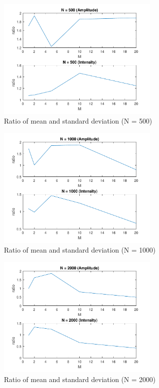 \documentclass{article}
\begin{document}
\begin{figure}[H]
	\centering
	\includegraphics[width = 0.7\textwidth]{src/2pi/ratio_500.pdf}
	\caption{Ratio of mean and standard deviation (N = 500)}
	\label{fig:ratio-500}
\end{figure}
\begin{figure}[H]
	\centering
	\includegraphics[width = 0.7\textwidth]{src/2pi/ratio_1000.pdf}
	\caption{Ratio of mean and standard deviation (N = 1000)}
	\label{fig:ratio-1000}
\end{figure}
\begin{figure}[H]
	\centering
	\includegraphics[width = 0.7\textwidth]{src/2pi/ratio_2000.pdf}
	\caption{Ratio of mean and standard deviation (N = 2000)}
	\label{fig:ratio-2000}
\end{figure}
\end{document}
